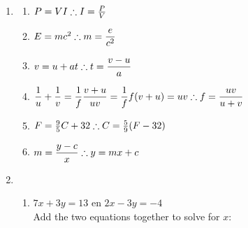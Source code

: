 \begin{eocsolutions}{}
{\begin{enumerate}[itemsep=7pt, label=\textbf{\arabic*}. ]
\begin{multicols}{2}
\begin{enumerate}[itemsep=6pt,label=\textbf{(\alph*)}]
\item $\dfrac{1-a}{2} - \dfrac{2-a}{3} \geq 1\\
\dfrac{1-a}{2} - \dfrac{(2+a)}{3} \geq 1\\
3-3a-4-2a \geq 6\\
-5a \geq 7\\
\therefore~ a \leq -\frac{7}{5}$
\item $-5 \leq 2k + 1 < 5\\
-6 \leq 2k < 4\\
\therefore -3 \leq k < 2$
\item $x-1=\dfrac{42}{x}\\$
Let op: $x \neq 0$.\\
$x^2-x=42\\
x^2-x-42=0\\
(x-7)(x+6)=0\\
\therefore x=7$ of $x=-6$
\end{enumerate}
\end{multicols}
\item
\begin{multicols}{2}
\begin{enumerate}[itemsep=6pt,label=\textbf{(\alph*)}]
\item $P = VI\\
\therefore I =\frac{P}{V}$
\item $E=mc^{2}\\[4pt]
\therefore m=\dfrac{e}{c^2}$
\item $v = u + at\\[4pt]
\therefore t = \dfrac{v-u}{a}$
\item $\dfrac{1}{u} + \dfrac{1}{v} = \dfrac{1}{f}\\
\dfrac{v+u}{uv} = \dfrac{1}{f}\\
f(v+u) = uv\\[4pt]
\therefore f= \dfrac{uv}{u+v}$
\item  $F=\frac{9}{5}C + 32\\
\therefore C=\frac{5}{9}(F-32)$
\item $m = \dfrac{y-c}{x}\\[4pt]
\therefore y = mx+c$
\end{enumerate}
\end{multicols}
\item 
\begin{enumerate}[itemsep=5pt,label=\textbf{(\alph*)}]
\item $7x+3y=13$ en $2x-3y=-4$\\
Add the two equations together to solve for $x$:\\


\end{enumerate}
\end{enumerate}}
\end{eocsolutions}

